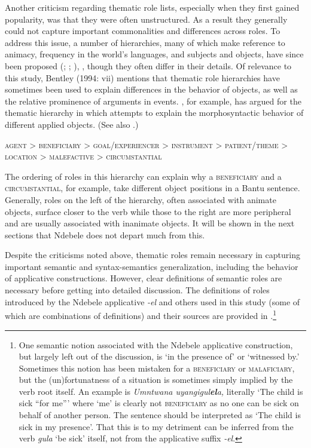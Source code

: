\documentclass[output=paper]{langsci/langscibook}
\begin{document}
Another criticism regarding thematic role lists, especially when they first gained popularity, was that they were often unstructured. As a result they generally could not capture important commonalities and differences across roles. To address this issue, a number of hierarchies, many of which make reference to animacy, frequency in the world’s languages, and subjects and objects, have since been proposed (\citealt{Fillmore1968};  \citealt[12]{SaintDizierViegas1995};    \citealt[334]{KiyosawaGerdts2010}), \citet{BresnanKanerva1989}, though they often differ in their details. Of relevance to this study, Bentley (1994: vii) mentions that thematic role hierarchies have sometimes been used to explain differences in the behavior of objects, as well as the relative prominence of arguments in events. \citet[129]{Mchombo2004}, for example, has argued for the thematic hierarchy in  which attempts to explain the morphosyntactic behavior of different applied objects. (See also \citealt{NgonyaniGithinji2006}.)

\ea
\textsc{agent > beneficiary > goal/experiencer > instrument > patient/theme > location > malefactive > circumstantial}\\
\z

The ordering of roles in this hierarchy can explain why a \textsc{beneficiary} and a \textsc{circumstantial}, for example, take different object positions in a Bantu sentence. Generally, roles on the left of the hierarchy, often associated with animate objects, surface closer to the verb while those to the right are more peripheral and are usually associated with inanimate objects. It will be shown in the next sections that Ndebele does not depart much from this.

 Despite the criticisms noted above, thematic roles remain necessary in capturing important semantic and syntax-semantics generalization, including the behavior of applicative constructions. However, clear definitions of semantic roles are necessary before getting into detailed discussion. The definitions of roles introduced by the Ndebele applicative \textit{-el} and others used in this study (some of which are combinations of definitions) and their sources are provided in .\footnote{One semantic notion associated with the Ndebele applicative construction, but largely left out of the discussion, is ‘in the presence of’ or ‘witnessed by.’ Sometimes this notion has been mistaken for a \textsc{beneficiary} or \textsc{malaficiary}, but the (un)fortunatness of a situation is sometimes simply implied by the verb root itself. An example is \textit{Umntwana uyangigul}\textbf{\textit{el}}\textit{a,} literally ‘The child is sick “for me”’ where ‘me’ is clearly not \textsc{beneficiary} as no one can be sick on behalf of another person. The sentence should be interpreted as ‘The child is sick in my presence’. That this is to my detriment can be inferred from the verb \textit{gula} ‘be sick’ itself, not from the applicative suffix \textit{-el}.} 
\end{document}
